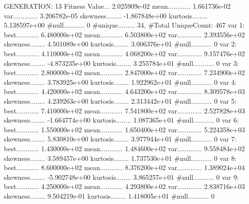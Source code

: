\documentclass[oneside,letterpaper,titlepage]{article}
\begin{document}
\begin{Schunk}
\begin{Soutput}
GENERATION: 13
Fitness Value... 2.025909e-02
mean............ 1.661736e-02
var............. 3.206782e-05
skewness........ -1.867848e+00
kurtosis........ 5.138597e+00
#null........... 0
#unique......... 34, #Total UniqueCount: 467
var 1:
best............ 6.480000e+02
mean............ 6.503800e+02
var............. 2.393556e+02
skewness........ 4.501089e+00
kurtosis........ 3.006376e+01
#null........... 0
var 2:
best............ 4.110000e+02
mean............ 4.068200e+02
var............. 9.157476e+02
skewness........ -4.873235e+00
kurtosis........ 3.255784e+01
#null........... 0
var 3:
best............ 2.800000e+02
mean............ 2.847000e+02
var............. 7.234900e+02
skewness........ 3.783925e+00
kurtosis........ 1.922962e+01
#null........... 0
var 4:
best............ 4.420000e+02
mean............ 4.643200e+02
var............. 8.309578e+03
skewness........ 4.239263e+00
kurtosis........ 2.313442e+01
#null........... 0
var 5:
best............ 7.410000e+02
mean............ 7.541800e+02
var............. 2.527828e+03
skewness........ -1.664774e+00
kurtosis........ 1.087365e+01
#null........... 0
var 6:
best............ 1.550000e+02
mean............ 1.650400e+02
var............. 5.224358e+03
skewness........ 5.830810e+00
kurtosis........ 3.977944e+01
#null........... 0
var 7:
best............ 1.430000e+02
mean............ 1.484600e+02
var............. 9.558484e+02
skewness........ 3.589457e+00
kurtosis........ 1.737530e+01
#null........... 0
var 8:
best............ 8.600000e+02
mean............ 8.376200e+02
var............. 1.389024e+04
skewness........ -5.902748e+00
kurtosis........ 3.865257e+01
#null........... 0
var 9:
best............ 4.250000e+02
mean............ 4.293800e+02
var............. 2.838716e+03
skewness........ 9.504219e-01
kurtosis........ 1.418005e+01
#null........... 0


\end{Soutput}
\end{Schunk}
\end{document}

